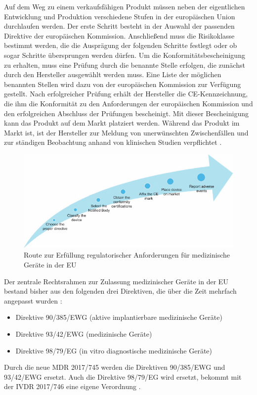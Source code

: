 \documentclass[a4paper,12pt]{report}
\begin{document}
Auf dem Weg zu einem verkaufsfähigen Produkt müssen neben der eigentlichen Entwicklung und Produktion verschiedene Stufen in der europäischen Union durchlaufen werden. Der erste Schritt besteht in der Auswahl der passenden Direktive der europäischen Kommission. Anschließend muss die Risikoklasse bestimmt werden, die die Ausprägung der folgenden Schritte festlegt oder ob sogar Schritte übersprungen werden dürfen. Um die Konformitätsbescheinigung zu erhalten, muss eine Prüfung durch die benannte Stelle erfolgen, die zunächst durch den Hersteller ausgewählt werden muss. Eine Liste der möglichen benannten Stellen wird dazu von der europäischen Kommission zur Verfügung gestellt. Nach erfolgreicher Prüfung erhält der Hersteller die CE-Kennzeichnung, die ihm die Konformität zu den Anforderungen der europäischen Kommission und den erfolgreichen Abschluss der Prüfungen bescheinigt. Mit dieser Bescheinigung kann das Produkt auf dem Markt platziert werden. Während das Produkt im Markt ist, ist der Hersteller zur Meldung von unerwünschten Zwischenfällen und zur ständigen Beobachtung anhand von klinischen Studien verpflichtet \citep[vgl.][S. 32f]{Ramakrishna2015}.
\begin{figure}[ht]
\centering
\includegraphics[width=1\textwidth]{Images/route_assure_compliance}
\caption[Route zur Erfüllung regulatorischer Anforderungen für medizinische Geräte in der EU]{Route zur Erfüllung regulatorischer Anforderungen für medizinische Geräte in der EU \citep[S. 33]{Ramakrishna2015}}
\label{route_assure_compliance}
\end{figure}

Der zentrale Rechtsrahmen zur Zulassung medizinischer Geräte in der EU bestand bisher aus den folgenden drei Direktiven, die über die Zeit mehrfach angepasst wurden \citep[vgl.][S. 32]{Ramakrishna2015}:
\begin{itemize}
\item Direktive 90/385/EWG (aktive implantierbare medizinische Geräte)
\item Direktive 93/42/EWG (medizinische Geräte)
\item Direktive 98/79/EG (in vitro diagnostische medizinische Geräte)
\end{itemize}
Durch die neue MDR 2017/745 werden die Direktiven 90/385/EWG und 93/42/EWG ersetzt. Auch die Direktive 98/79/EG wird ersetzt, bekommt mit der IVDR 2017/746 eine eigene Verordnung \citep[vgl.][]{Johner2018}.
\end{document}
